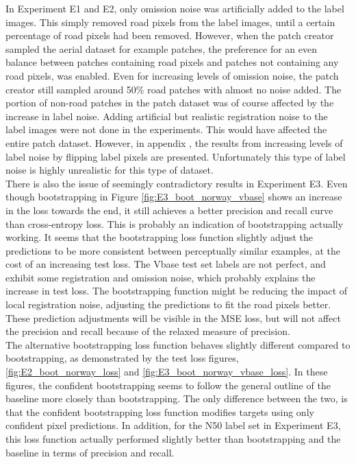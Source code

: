 In Experiment E1 and E2, only omission noise was artificially added to the label images. This simply removed road pixels from the label images, until a certain percentage of road pixels had been removed. However, when the patch creator sampled the aerial dataset for example patches, the preference for an even balance between patches containing road pixels and patches not containing any road pixels, was enabled. Even for increasing levels of omission noise, the patch creator still sampled around 50\% road patches with almost no noise added. The portion of non-road patches in the patch dataset was of course affected by the increase in label noise. Adding artificial but realistic registration noise to the label images were not done in the experiments. This would have affected the entire patch dataset. However, in appendix , the results from increasing levels of label noise by flipping label pixels are presented. Unfortunately this type of label noise is highly unrealistic for this type of dataset.\\

There is also the issue of seemingly contradictory results in Experiment E3. Even though bootstrapping in Figure \ref{fig:E3_boot_norway_vbase} shows an increase in the loss towards the end, it still achieves a better precision and recall curve than cross-entropy loss. This is probably an indication of bootstrapping actually working. It seems that the bootstrapping loss function slightly adjust the predictions to be more consistent between perceptually similar examples, at the cost of an increasing test loss. The Vbase test set labels are not perfect, and exhibit some registration and omission noise, which probably explains the increase in test loss. The bootstrapping function might be reducing the impact of local registration noise,  adjusting the predictions to fit the road pixels better. These prediction adjustments will be visible in the MSE loss, but will not affect the precision and recall because of the relaxed measure of precision. \\

The alternative bootstrapping loss function  behaves slightly different compared to bootstrapping, as demonstrated by the test loss figures, \ref{fig:E2_boot_norway_loss} and \ref{fig:E3_boot_norway_vbase_loss}. In these figures, the confident bootstrapping seems to follow the general outline of the baseline more closely than bootstrapping. The only difference between the two, is that the confident bootstrapping loss function modifies targets using only confident pixel predictions. In addition, for the N50 label set in Experiment E3, this loss function actually performed slightly better than bootstrapping and the baseline in terms of precision and recall. \\ 

